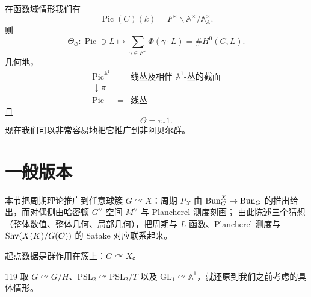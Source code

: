 在函数域情形我们有
\begin{equation}\tag{17.132}\label{eq:17.132}
\operatorname{Pic}(C)(k)=F^{\times}\backslash\mathbb A^{\times}\big/\mathbb A_A^{\times}.
\end{equation}
则
\begin{equation}\tag{17.133}\label{eq:17.133}
\Theta_{\Phi}\colon\operatorname{Pic}\ni L\mapsto
\sum_{\gamma\in F^{\times}}\Phi(\gamma\cdot L)=\# H^0(C,L).
\end{equation}
几何地，
\begin{equation}\tag{17.134}\label{eq:17.134}
\begin{array}{ccc}
\operatorname{Pic}^{\mathbb A^1} & = & \text{线丛及相伴 $\mathbb A^1$-丛的截面}\\[2pt]
\downarrow{\scriptstyle \pi} & & \\[2pt]
\operatorname{Pic} & = & \text{线丛}
\end{array}
\end{equation}
且
\begin{equation}\tag{17.135}\label{eq:17.135}
\Theta=\pi_*1.
\end{equation}
现在我们可以非常容易地把它推广到非阿贝尔群。


\section{一般版本}

\begin{sectionkey}
本节把周期理论推广到任意球簇 $G\curvearrowright X$：周期 $P_X$ 由 $\mathrm{Bun}^X_G\to\mathrm{Bun}_G$
的推出给出，而对偶侧由哈密顿 $G^{\vee}$-空间 $M^{\vee}$ 与 Plancherel 测度刻画；
由此陈述三个猜想（整体数值、整体几何、局部几何），把周期与 $L$-函数、Plancherel 测度与
$\mathrm{Shv}(X(K)/G(\mathcal{O}))$ 的 Satake 对应联系起来。
\end{sectionkey}

起点数据是群作用在簇上：$G\curvearrowright X$。

\begin{srcex}{119}
取 $G\curvearrowright G/H$、$\mathrm{PSL}_2\curvearrowright\mathrm{PSL}_2/T$ 以及
$\mathrm{GL}_1\curvearrowright\mathbb A^1$，就还原到我们之前考虑的具体情形。
\end{srcex}


